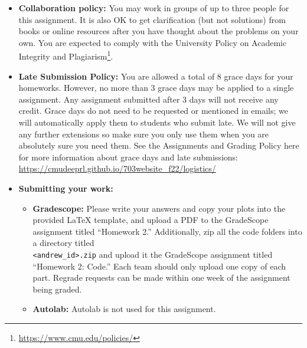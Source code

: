 \documentclass[12pt]{article}
\begin{document}
\begin{itemize}
\item \textbf{Collaboration policy:} You may work in groups of up to three people for this assignment. It is also OK to get clarification (but not solutions) from books or online resources after you have thought about the problems on your own.  You are expected to comply with the University Policy on Academic Integrity and Plagiarism\footnote{\url{https://www.cmu.edu/policies/}}.

\item\textbf{Late Submission Policy:} You are allowed a total of 8 grace days for your homeworks. However, no more than 3 grace days may be applied to a single assignment. Any assignment submitted after 3 days will not receive any credit.  Grace days do not need to be requested or mentioned in emails; we will automatically apply them to students who submit late. We will not give any further extensions so make sure you only use them when you are absolutely sure you need them.  See the Assignments and Grading Policy here for more information about grace days and late submissions: \url{https://cmudeeprl.github.io/703website_f22/logistics/}

\item\textbf{Submitting your work:} 
\begin{itemize}


\item \textbf{Gradescope:} Please write your answers and copy your plots into the provided LaTeX template, and upload a PDF to the GradeScope assignment titled ``Homework 2.'' Additionally, zip all the code folders into a directory titled \\\texttt{<andrew\_id>.zip} and upload it the GradeScope assignment titled ``Homework 2: Code.'' Each team should only upload one copy of each part. Regrade requests can be made within one week of the assignment being graded.
\item \textbf{Autolab:} Autolab is not used for this assignment.
\end{itemize}
\end{itemize}
\end{document}
